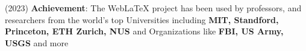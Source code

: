 (2023) \textbf{Achievement}{: The WebLaTeX project has been used by professors, and researchers from the world's top Universities including \textbf{MIT, Standford, Princeton, ETH Zurich, NUS} and Organizations like \textbf{FBI, US Army, USGS} and more} \\